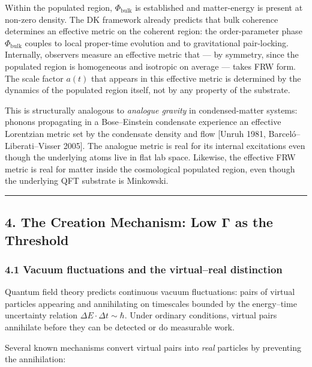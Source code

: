 \documentclass[
]{article}
\begin{document}
Within the populated region, \(\Phi_{\text{bulk}}\) is established and
matter-energy is present at non-zero density. The DK framework already
predicts that bulk coherence determines an effective metric on the
coherent region: the order-parameter phase \(\Phi_{\text{bulk}}\)
couples to local proper-time evolution and to gravitational
pair-locking. Internally, observers measure an effective metric that ---
by symmetry, since the populated region is homogeneous and isotropic on
average --- takes FRW form. The scale factor \(a(t)\) that appears in
this effective metric is determined by the dynamics of the populated
region itself, not by any property of the substrate.

This is structurally analogous to \emph{analogue gravity} in
condensed-matter systems: phonons propagating in a Bose--Einstein
condensate experience an effective Lorentzian metric set by the
condensate density and flow {[}Unruh 1981, Barceló--Liberati--Visser
2005{]}. The analogue metric is real for its internal excitations even
though the underlying atoms live in flat lab space. Likewise, the
effective FRW metric is real for matter inside the cosmological
populated region, even though the underlying QFT substrate is Minkowski.

\begin{center}\rule{0.5\linewidth}{0.5pt}\end{center}

\subsection{4. The Creation Mechanism: Low Γ as the
Threshold}\label{the-creation-mechanism-low-ux3b3-as-the-threshold}

\subsubsection{4.1 Vacuum fluctuations and the virtual--real
distinction}\label{vacuum-fluctuations-and-the-virtualreal-distinction}

Quantum field theory predicts continuous vacuum fluctuations: pairs of
virtual particles appearing and annihilating on timescales bounded by
the energy--time uncertainty relation
\(\Delta E \cdot \Delta t \sim \hbar\). Under ordinary conditions,
virtual pairs annihilate before they can be detected or do measurable
work.

Several known mechanisms convert virtual pairs into \emph{real}
particles by preventing the annihilation:
\end{document}

